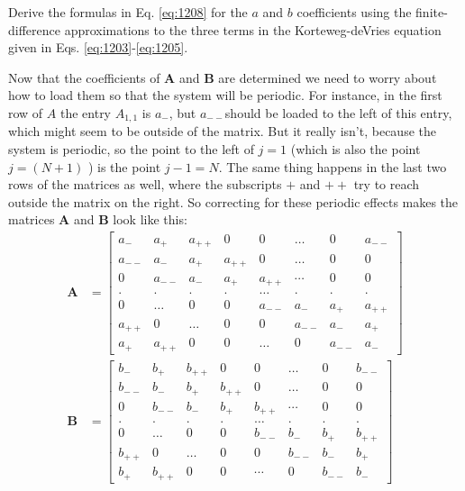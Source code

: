 \begin{problem}\label{P12.1}
Derive the formulas in Eq. \ref{eq:1208} for the $a$ and $b$ coefficients using the finite-difference approximations to the three terms in the Korteweg-deVries equation given in Eqs. \ref{eq:1203}-\ref{eq:1205}.
\end{problem}
Now that the coefficients of $\mathbf{A}$ and $\mathbf{B}$ are determined we need to worry about how to load them so that the system will be periodic. For instance, in the first row of $A$ the entry $A_{1,1}$ is $a_{-}$, but $a_{--}$should be loaded to the left of this entry, which might seem to be outside of the matrix. But it really isn\rq t, because the system is periodic, so the point to the left of $j=1$ (which is also the point $j=(N+1)$ ) is the point $j-1=N$. The same thing happens in the last two rows of the matrices as well, where the subscripts $+$ and $++$ try to reach outside the matrix on the right. So correcting for these periodic effects makes the matrices $\mathbf{A}$ and $\mathbf{B}$ look like this:
\begin{equation}\label{eq:1209}
\begin{aligned}
\mathbf{A} &=\left[\begin{array}{cccccccc}
a_{-} & a_{+} & a_{++} & 0 & 0 & \ldots & 0 & a_{--} \\
a_{--} & a_{-} & a_{+} & a_{++} & 0 & \ldots & 0 & 0 \\
0 & a_{--} & a_{-} & a_{+} & a_{++} & \cdots & 0 & 0 \\
. & . & . & . & \ldots & . & . & . \\
0 & \ldots & 0 & 0 & a_{--} & a_{-} & a_{+} & a_{++} \\
a_{++} & 0 & \ldots & 0 & 0 & a_{--} & a_{-} & a_{+} \\
a_{+} & a_{++} & 0 & 0 & \ldots & 0 & a_{--} & a_{-}
\end{array}\right] \\
\mathbf{B} &=\left[\begin{array}{cccccccc}
b_{-} & b_{+} & b_{++} & 0 & 0 & \ldots & 0 & b_{--} \\
b_{--} & b_{-} & b_{+} & b_{++} & 0 & \ldots & 0 & 0 \\
0 & b_{--} & b_{-} & b_{+} & b_{++} & \cdots & 0 & 0 \\
. & . & . & . & \ldots & . & . & . \\
0 & \ldots & 0 & 0 & b_{--} & b_{-} & b_{+} & b_{++} \\
b_{++} & 0 & \ldots & 0 & 0 & b_{--} & b_{-} & b_{+} \\
b_{+} & b_{++} & 0 & 0 & \cdots & 0 & b_{--} & b_{-}
\end{array}\right]
\end{aligned}
\end{equation}

